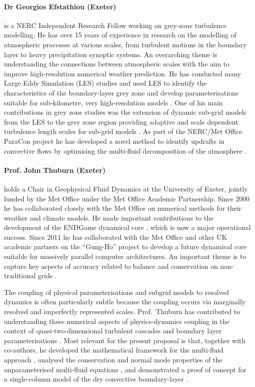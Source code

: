 \documentclass[11pt,a4paper]{article}
\begin{document}
\paragraph*{Dr Georgios Efstathiou (Exeter)} is a NERC Independent Research Fellow working on grey-zone turbulence modelling. He has over 15 years of experience in research on the modelling of
atmospheric processes at various scales, from turbulent motions in the boundary layer
to heavy precipitation synoptic systems. An overarching theme is understanding the
connections between atmospheric scales with the aim to improve high-resolution
numerical weather prediction. He has conducted many Large Eddy Simulation (LES) studies and used LES to identify 
the characteristics of the boundary-layer grey zone \citep[e.g.][]{efstathiou2015}
and develop parameterisations suitable for sub-kilometre, very high-resolution models 
\citep{efstathiou2016}. One of his main contributions in grey zone 
studies was the extension of dynamic sub-grid models from the LES to the grey zone region 
providing adaptive and scale dependent turbulence length scales for sub-grid models 
\citep{efstathiou2018,efstathiou2019a}. As part of the NERC/Met Office ParaCon 
project he has developed a novel method to identify updrafts in convective flows 
by optimising the multi-fluid decomposition of the atmosphere \citep{ETB20}.

\paragraph*{Prof. John Thuburn (Exeter)} holds a Chair in Geophysical Fluid Dynamics at the University of Exeter, jointly
funded by the Met Office under the Met Office Academic Partnership.
Since 2000 he has collaborated closely with the Met Office on numerical methods for their
weather and climate models. He made important contributions to the development of the
ENDGame dynamical core \cite[e.g.][]{WSW+14}, which is now a major operational success.
Since 2011 he has collaborated with the Met Office and other UK academic partners on the ``Gung-Ho''
project to develop a future dynamical core suitable for massively parallel computer
architectures. An important theme is to capture key aspects of accuracy related to balance and
conservation on non-traditional grids \cite[e.g.][]{TC15}.

The coupling of physical parameterisations and subgrid models to resolved dynamics is often
particularly subtle because the coupling occurs via marginally resolved and imperfectly
represented scales. Prof.\ Thuburn has contributed to understanding these numerical aspects
of physics-dynamics coupling in the context of quasi-two-dimensional turbulent cascades \cite[e.g.][]{TKW14} and boundary layer parameterisations \cite[]{HTW13a}.
Most relevant for the present proposal is that,
together with co-authors, he developed the mathematical framework for the multi-fluid
approach \citep[][]{TWV+18}, analysed the conservation and normal mode properties
of the unparameterised multi-fluid equations \citep[][]{TV18}, and demonstrated
a proof of concept for a single-column model of the dry convective boundary-layer \citep[][]{TEB19}.
\end{document}
